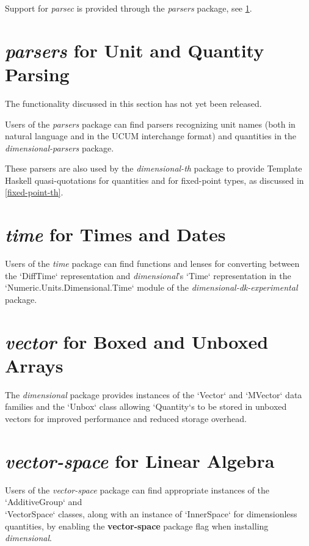 \documentclass[11pt]{report}
\newcommand{\packagename}[1]{\textit{#1}}
\newcommand{\thispackage}{\packagename{dimensional}}
\newcommand{\experimentalpackage}{\packagename{dimensional-dk-experimental}}
\newcommand{\flag}[1]{\textbf{#1}}
\newcommand{\prerelease}{\begin{framed}
The functionality discussed in this section has not yet been released.
\end{framed}}
\begin{document}
Support for \packagename{parsec} is provided through the \packagename{parsers} package, see \ref{parsers-support}.

\section{\packagename{parsers} for Unit and Quantity Parsing} \label{parsers-support}

\prerelease{}

Users of the \packagename{parsers} package can find parsers recognizing
unit names (both in natural language and in the UCUM interchange format) and
quantities in the \packagename{dimensional-parsers} package.

These parsers are also used by the \packagename{dimensional-th} package to provide
Template Haskell quasi-quotations for quantities and for fixed-point types, as
discussed in \ref{fixed-point-th}.

\section{\packagename{time} for Times and Dates}

Users of the \packagename{time} package can find functions and lenses for converting
between the `DiffTime` representation and \thispackage{}'s `Time` representation in the
`Numeric.Units.Dimensional.Time` module of the \experimentalpackage{} package.

\section{\packagename{vector} for Boxed and Unboxed Arrays}

The \thispackage{} package provides instances of the `Vector` and `MVector` data families and the `Unbox` class
allowing `Quantity`s to be stored in unboxed vectors for improved performance and reduced storage overhead.

\section{\packagename{vector-space} for Linear Algebra}

Users of the \packagename{vector-space} package can find appropriate instances of the `AdditiveGroup` and \\
`VectorSpace` classes, along with an instance of `InnerSpace` for dimensionless quantities, by enabling the \flag{vector-space}
package flag when installing \thispackage{}.
\end{document}
